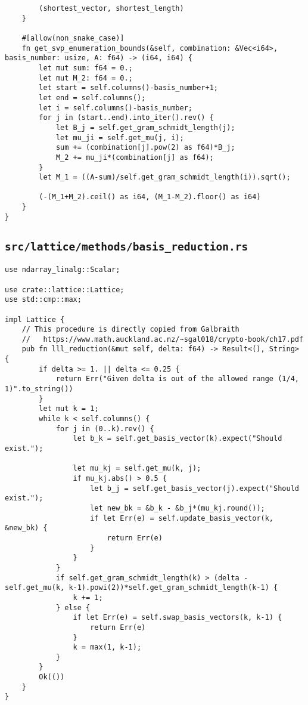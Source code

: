 \begin{verbatim}
        (shortest_vector, shortest_length)
    }

    #[allow(non_snake_case)]
    fn get_svp_enumeration_bounds(&self, combination: &Vec<i64>, basis_number: usize, A: f64) -> (i64, i64) {
        let mut sum: f64 = 0.;
        let mut M_2: f64 = 0.;
        let start = self.columns()-basis_number+1;
        let end = self.columns();
        let i = self.columns()-basis_number;
        for j in (start..end).into_iter().rev() {
            let B_j = self.get_gram_schmidt_length(j);
            let mu_ji = self.get_mu(j, i);
            sum += (combination[j].pow(2) as f64)*B_j;
            M_2 += mu_ji*(combination[j] as f64);
        }
        let M_1 = ((A-sum)/self.get_gram_schmidt_length(i)).sqrt();

        (-(M_1+M_2).ceil() as i64, (M_1-M_2).floor() as i64)
    }
}
\end{verbatim}


\subsection{\texttt{src/lattice/methods/basis_reduction.rs}}

\begin{verbatim}
use ndarray_linalg::Scalar;

use crate::lattice::Lattice;
use std::cmp::max;

impl Lattice {
    // This procedure is directly copied from Galbraith
    //   https://www.math.auckland.ac.nz/~sgal018/crypto-book/ch17.pdf
    pub fn lll_reduction(&mut self, delta: f64) -> Result<(), String> {
        if delta >= 1. || delta <= 0.25 {
            return Err("Given delta is out of the allowed range (1/4, 1)".to_string())
        }
        let mut k = 1;
        while k < self.columns() {
            for j in (0..k).rev() {
                let b_k = self.get_basis_vector(k).expect("Should exist.");

                let mu_kj = self.get_mu(k, j);
                if mu_kj.abs() > 0.5 {
                    let b_j = self.get_basis_vector(j).expect("Should exist.");
                    let new_bk = &b_k - &b_j*(mu_kj.round());
                    if let Err(e) = self.update_basis_vector(k, &new_bk) {
                        return Err(e)
                    }
                }
            }
            if self.get_gram_schmidt_length(k) > (delta - self.get_mu(k, k-1).powi(2))*self.get_gram_schmidt_length(k-1) {
                k += 1;
            } else {
                if let Err(e) = self.swap_basis_vectors(k, k-1) {
                    return Err(e)
                }
                k = max(1, k-1);
            }
        }
        Ok(())
    }
}
\end{verbatim}


